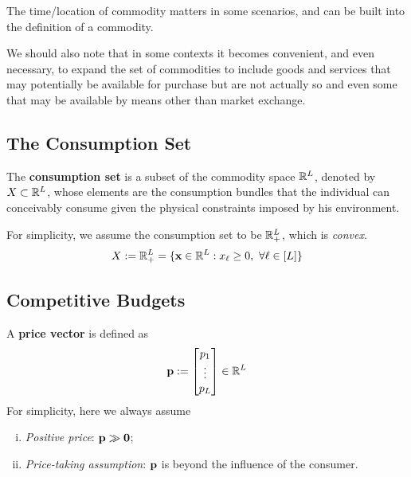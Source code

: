 \documentclass{report}
\begin{document}
 			\begin{remark}
 				The time/location of commodity matters in some scenarios, and can be built into the definition of a commodity.
 			\end{remark}
 			
 			\begin{remark}
 				We should also note that in some contexts it becomes convenient, and even necessary, to expand the set of commodities to include goods and services that may potentially be available for purchase but are not actually so and even some that may be available by means other than market exchange.
 			\end{remark}
 		
 		\subsection{The Consumption Set}
 			\begin{definition}
 				The \textbf{consumption set} is a subset of the commodity space $\mathbb{R}^L$, denoted by $X \subset \mathbb{R}^L$, whose elements are the consumption bundles that the individual can conceivably consume given the physical constraints imposed by his environment.
 			\end{definition}
 			
 			\begin{assumption}
 				For simplicity, we assume the consumption set to be $\mathbb{R}_+^L$, which is \emph{convex}.
 				\begin{equation}
 					X := \R_+^L = \{\vex \in \R^L: x_{\ell} \geq 0,\ \forall \ell \in [L]\}
 				\end{equation}
 			\end{assumption}
 			
 		\subsection{Competitive Budgets}
 			\begin{definition}
 				A \textbf{price vector} is defined as
 				\begin{equation}
 					\textbf{p} := \begin{bmatrix} p_1 \\ \vdots \\ p_L \end{bmatrix} \in \mathbb{R}^L
 				\end{equation}
 				For simplicity, here we always assume 
 				\begin{enumerate}[(i)]
 					\item \emph{Positive price}: $\textbf{p} \gg \textbf{0}$;
 					\item \emph{Price-taking assumption}: $\textbf{p}$ is beyond the influence of the consumer.
 				\end{enumerate}
 			\end{definition}
 			
\end{document}
